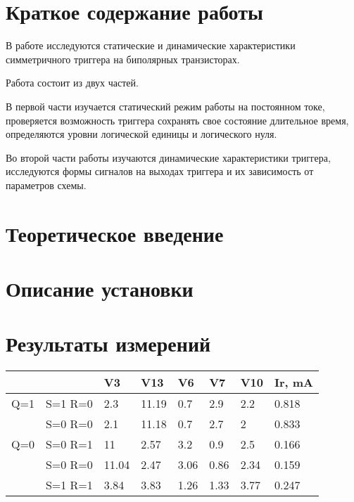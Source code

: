 \documentclass[a4paper,14pt]{article}
\begin{document}

\tableofcontents
\pagebreak
\section{Краткое содержание работы}

В работе исследуются статические и динамические характеристики симметричного триггера на биполярных транзисторах.

Работа состоит из двух частей.

В первой части изучается статический режим работы на постоянном токе,
проверяется возможность триггера сохранять свое состояние длительное время,
определяются уровни логической единицы и логического нуля.

Во второй части работы изучаются динамические характеристики триггера,
исследуются формы сигналов на выходах триггера и их зависимость от параметров схемы.

\section{Теоретическое введение}


\section{Описание установки}


\section{Результаты измерений}

\begin{table}[H]
	\begin{center}
	\begin{tabular}{|l|l|l|l|l|l|l|l|}
		\hline
		&         & V3    & V13   & V6   & V7   & V10  & Ir, mA \\ \hline
		Q=1 & S=1 R=0 & 2.3   & 11.19 & 0.7  & 2.9  & 2.2  & 0.818  \\ \hline
		& S=0 R=0 & 2.1   & 11.18 & 0.7  & 2.7  & 2    & 0.833  \\ \hline
		Q=0 & S=0 R=1 & 11    & 2.57  & 3.2  & 0.9  & 2.5  & 0.166  \\ \hline
		& S=0 R=0 & 11.04 & 2.47  & 3.06 & 0.86 & 2.34 & 0.159  \\ \hline
		& S=1 R=1 & 3.84  & 3.83  & 1.26 & 1.33 & 3.77 & 0.247  \\ \hline
	\end{tabular}
\end{center}
\end{table}
\end{document}
